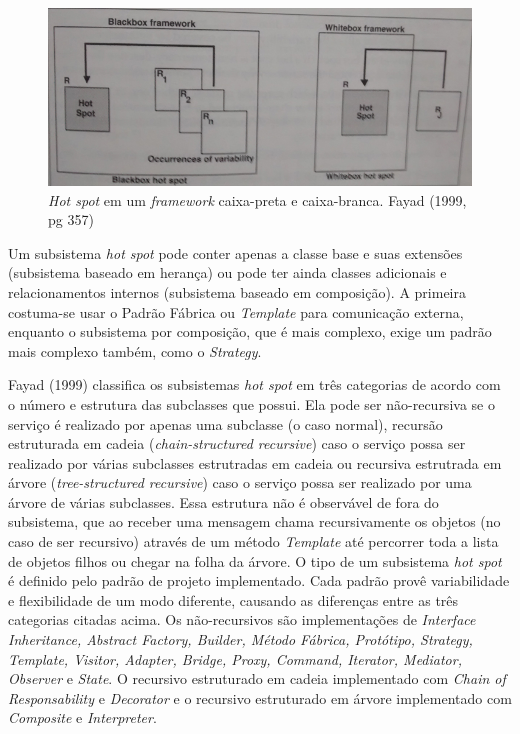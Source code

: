 \begin{figure}[h]
	\centering
	\label{fig12}
		\includegraphics[keepaspectratio=true,scale=0.3]{figuras/hotspotbox.jpg}
	\caption{\textit{Hot spot} em um \textit{framework} caixa-preta e caixa-branca. Fayad (1999, pg 357)}
\end{figure}

Um subsistema \textit{hot spot} pode conter apenas a classe base e suas extensões (subsistema baseado em herança) ou pode ter ainda classes adicionais e relacionamentos internos (subsistema baseado em composição). A primeira costuma-se usar o Padrão Fábrica ou \textit{Template} para comunicação externa, enquanto o subsistema por composição, que é mais complexo, exige um padrão mais complexo também, como o \textit{Strategy}.

Fayad (1999) classifica os subsistemas \textit{hot spot} em três categorias de acordo com o número e estrutura das subclasses que possui. Ela pode ser não-recursiva se o serviço é realizado por apenas uma subclasse (o caso normal), recursão estruturada em cadeia (\textit{chain-structured recursive}) caso o serviço possa ser realizado por várias subclasses estrutradas em cadeia ou recursiva estrutrada em árvore (\textit{tree-structured recursive}) caso o serviço possa ser realizado por uma árvore de várias subclasses. Essa estrutura não é observável de fora do subsistema, que ao receber uma mensagem chama recursivamente os objetos (no caso de ser recursivo) através de um método \textit{Template} até percorrer toda a lista de objetos filhos ou chegar na folha da árvore. O tipo de um subsistema \textit{hot spot} é definido pelo padrão de projeto implementado. Cada padrão provê variabilidade e flexibilidade de um modo diferente, causando as diferenças entre as três categorias citadas acima. Os não-recursivos são implementações de \textit{Interface Inheritance, Abstract Factory, Builder, Método Fábrica, Protótipo, Strategy, Template, Visitor, Adapter, Bridge, Proxy, Command, Iterator, Mediator, Observer} e \textit{State}. O recursivo estruturado em cadeia implementado com \textit{Chain of Responsability} e \textit{Decorator} e o recursivo estruturado em árvore implementado com \textit{Composite} e \textit{Interpreter}.

